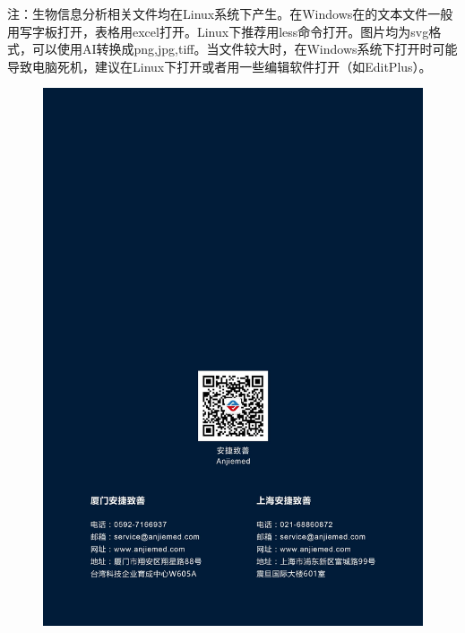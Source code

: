 \documentclass[a4paper,10pt]{article}
\numberwithin{figure}{section}
\numberwithin{table}{section}
\begin{document}
注：生物信息分析相关文件均在Linux系统下产生。在Windows在的文本文件一般用写字板打开，表格用excel打开。Linux下推荐用less命令打开。图片均为svg格式，可以使用AI转换成png,jpg,tiff。当文件较大时，在Windows系统下打开时可能导致电脑死机，建议在Linux下打开或者用一些编辑软件打开（如EditPlus）。
\newpage





\begin{titlepage}
\begin{figure}
 \includegraphics[width=21cm]{./images/Backcover.png}\\[0cm]  
\end{figure}
\restoregeometry

\end{titlepage}
\end{document}
